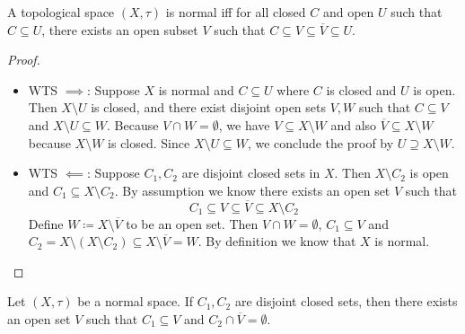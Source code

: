 \documentclass[screen,single]{techreport}
\numberwithin{equation}{section}
\begin{document}
\begin{lemma}\label{Lem:NormalIffNeighborContainClosure}
	A topological space $(X,\tau)$ is normal iff for all closed $C$ and open $U$ such that $C \subseteq U$, there exists an open subset $V$ such that $C \subseteq V \subseteq \overline{V} \subseteq U$.
\end{lemma}
\begin{proof}\
	\begin{itemize}
		\item WTS $\implies$: Suppose $X$ is normal and $C \subseteq U$ where $C$ is closed and $U$ is open.
		Then $X \setminus U$ is closed, and there exist disjoint open sets $V,W$ such that $C \subseteq V$ and $X \setminus U \subseteq W$.
		Because $V \cap W = \emptyset$, we have $V \subseteq X \setminus W$ and also $\overline{V} \subseteq X \setminus W$ because $X \setminus W$ is closed.
		Since $X \setminus U \subseteq W$, we conclude the proof by $U \supseteq X \setminus W$.
		\item WTS $\impliedby$: Suppose $C_1,C_2$ are disjoint closed sets in $X$.
		Then $X \setminus C_2$ is open and $C_1 \subseteq X \setminus C_2$.
		By assumption we know there exists an open set $V$ such that
		\[
		C_1 \subseteq V \subseteq \overline{V} \subseteq X \setminus C_2
		\]
		Define $W \coloneqq X \setminus \overline{V}$ to be an open set.
		Then $V \cap W = \emptyset$, $C_1 \subseteq V$ and $C_2 = X \setminus (X \setminus C_2) \subseteq X \setminus \overline{V} = W$.
		By definition we know that $X$ is normal.
	\end{itemize}
\end{proof}

\begin{corollary}\label{Cor:NormalIffNeighborContainClosure}
	Let $(X,\tau)$ be a normal space.
	If $C_1,C_2$ are disjoint closed sets, then there exists an open set $V$ such that $C_1 \subseteq V$ and $C_2 \cap \overline{V} =\emptyset$.
\end{corollary}
\end{document}
